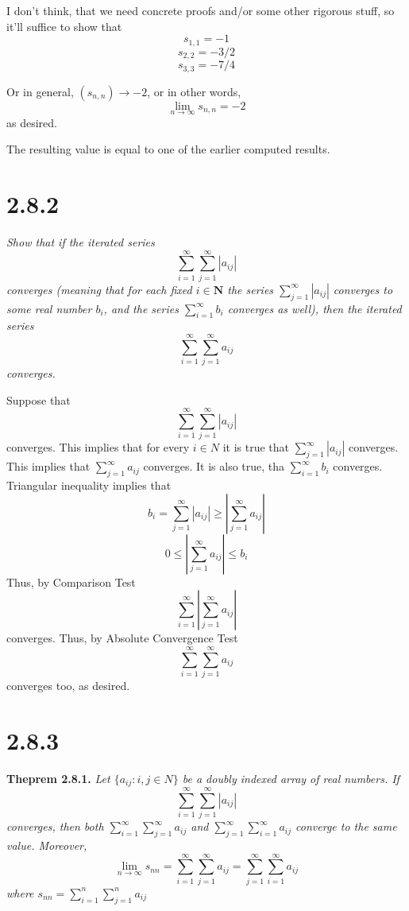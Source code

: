 \documentclass[11pt,oneside,titlepage]{article}
\begin{document}
I don't think, that we need concrete proofs and/or some other rigorous stuff,
so it'll suffice to show that
$$s_{1,1} = -1$$
$$s_{2,2} = -3/2$$
$$s_{3,3} = -7/4$$

Or in general, $(s_{n,n}) \to  -2$, or in other words,
$$\lim_{n \to \infty} s_{n,n} = -2$$
as desired.

The resulting value is equal to one of the earlier computed results.

\section*{2.8.2}

\textit{Show that if the iterated series }
$$\sum_{i = 1}^{\infty}\sum_{j = 1}^{\infty}|a_{ij}|$$
\textit{converges (meaning that for each fixed $i \in \textbf{N}$ the series
  $\sum_{j = 1}^{\infty}|a_{ij}|$ converges to some real number $b_i$, and
  the series $\sum_{i = 1}^{\infty}b_i$ converges as well), then the iterated
  series}
$$\sum_{i = 1}^{\infty}\sum_{j = 1}^{\infty}a_{ij}$$
\textit{converges.}

Suppose that
$$\sum_{i = 1}^{\infty}\sum_{j = 1}^{\infty}|a_{ij}|$$
converges. This implies that for every $i \in N$ it is true that
$\sum_{j = 1}^{\infty}|a_{ij}|$  converges. This implies that
$\sum_{j = 1}^{\infty}a_{ij}$ converges. It is also true, tha
$\sum_{i = 1}^{\infty}b_{i}$ converges. Triangular inequality implies that
$$ b_i =  \sum_{j = 1}^{\infty}|a_{ij}| \geq \left|\sum_{j = 1}^{\infty}a_{ij}\right|$$
$$  0 \leq \left|\sum_{j = 1}^{\infty}a_{ij}\right| \leq b_i$$
Thus, by Comparison Test
$$\sum_{i = 1}^{\infty}\left|\sum_{j = 1}^{\infty}a_{ij}\right|$$
converges. Thus, by Absolute Convergence Test
$$\sum_{i = 1}^{\infty}\sum_{j = 1}^{\infty}a_{ij}$$
converges too, as desired.



\section*{2.8.3}

\textbf{Theprem 2.8.1.}
\textit{Let $\{a_{ij}: i, j \in N\}$ be a doubly indexed array of real numbers.
If}
$$\sum_{i = 1}^{\infty}\sum_{j = 1}^{\infty}|a_{ij}|$$
\textit{converges, then both
  $\sum_{i = 1}^{\infty}\sum_{j = 1}^{\infty} a_{ij}$ and
  $\sum_{j = 1}^{\infty}\sum_{i = 1}^{\infty} a_{ij}$ converge to the same value. Moreover, }
$$\lim_{n \to \infty} s_{nn} = \sum_{i = 1}^{\infty}\sum_{j = 1}^{\infty}a_{ij} = \sum_{j = 1}^{\infty}\sum_{i = 1}^{\infty}a_{ij}$$
\textit{where $s_{nn} = \sum_{i = 1}^{n}\sum_{j = 1}^{n}a_{ij}$}
\end{document}
